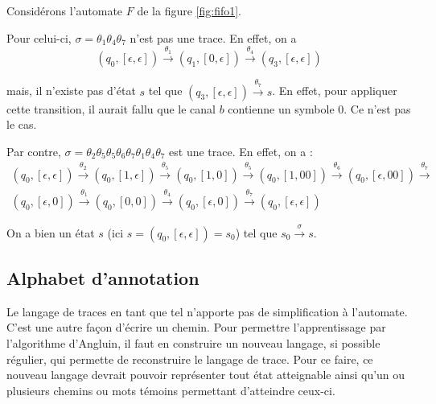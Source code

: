 \begin{example}
  Considérons l'automate $F$ de la figure \ref{fig:fifo1}.

  Pour celui-ci, $\sigma=\theta_1\theta_4\theta_7$ n'est pas une trace. En effet, on a
  $$
  (q_0,[\epsilon,\epsilon])\xrightarrow{\theta_1}(q_1,[0,\epsilon])\xrightarrow{\theta_4}(q_3,[\epsilon,\epsilon])
  $$

  mais, il n'existe pas d'état $s$ tel que $(q_3,[\epsilon,\epsilon])\xrightarrow{\theta_7}s$. En effet, pour appliquer cette transition, il aurait fallu que le canal $b$ contienne un symbole $0$. Ce n'est pas le cas.

  Par contre, $\sigma=\theta_2\theta_5\theta_5\theta_6\theta_7\theta_1\theta_4\theta_7$ est une trace. En effet, on a :
  \begin{equation*}
    \begin{gathered}
      (q_0,[\epsilon,\epsilon])\xrightarrow{\theta_2}
      (q_0,[1,\epsilon])\xrightarrow{\theta_5}
      (q_0,[1,0])\xrightarrow{\theta_5}
      (q_0,[1,00])\xrightarrow{\theta_6}
      (q_0,[\epsilon,00])\xrightarrow{\theta_7}\\
      (q_0,[\epsilon,0])\xrightarrow{\theta_1}
      (q_0,[0,0])\xrightarrow{\theta_4}
      (q_0,[\epsilon,0])\xrightarrow{\theta_7}
      (q_0,[\epsilon,\epsilon])
    \end{gathered}
  \end{equation*}

  On a bien un état $s$ (ici $s=(q_0,[\epsilon,\epsilon])=s_0$) tel que $s_0\xrightarrow{\sigma}s$.

\end{example}





\subsection{Alphabet d'annotation}

Le langage de traces en tant que tel n'apporte pas de simplification à l'automate. C'est une autre façon d'écrire un chemin. Pour permettre l'apprentissage par l'algorithme d'Angluin, il faut en construire un nouveau langage, si possible régulier, qui permette de reconstruire le langage de trace. Pour ce faire, ce nouveau langage devrait pouvoir représenter tout état atteignable ainsi qu'un ou plusieurs chemins ou mots témoins permettant d'atteindre ceux-ci.

